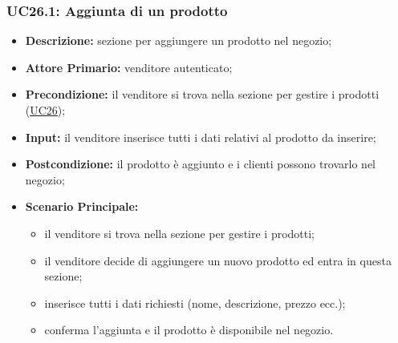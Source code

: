 \subsubsection{UC26.1: Aggiunta di un prodotto}
\label{sec:UC26.1}
\begin{itemize}
    \item \textbf{Descrizione:} sezione per aggiungere un prodotto nel negozio;
    \item \textbf{Attore Primario:} venditore autenticato;
    \item \textbf{Precondizione:} il venditore si trova nella sezione per gestire i prodotti (\hyperref[sec:UC26]{\underline{UC26}});
    \item \textbf{Input:} il venditore inserisce tutti i dati relativi al prodotto da inserire;
    \item \textbf{Postcondizione:} il prodotto è aggiunto e i clienti possono trovarlo nel negozio;
    \item \textbf{Scenario Principale:}
          \begin{itemize}
              \item il venditore si trova nella sezione per gestire i prodotti;
              \item il venditore decide di aggiungere un nuovo prodotto ed entra in questa sezione;
              \item inserisce tutti i dati richiesti (nome, descrizione, prezzo ecc.);
              \item conferma l'aggiunta e il prodotto è disponibile nel negozio.
          \end{itemize}
\end{itemize}
